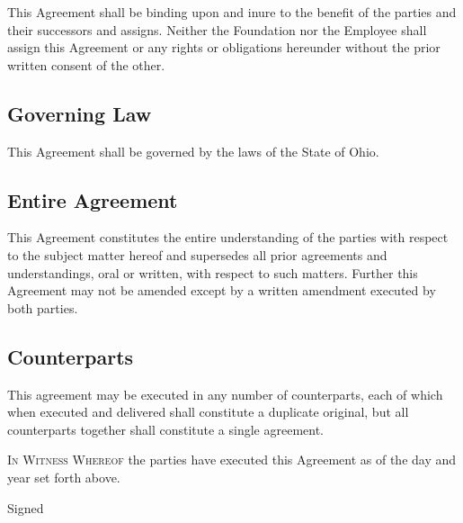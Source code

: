 \documentclass{ross}
\begin{document}
This Agreement shall be binding upon and inure to the benefit of the parties and their successors and assigns. Neither the Foundation nor the Employee shall assign this Agreement or any rights or obligations hereunder without the prior written consent of the other.

\subsection{Governing Law}

This Agreement shall be governed by the laws of the State of Ohio.

\subsection{Entire Agreement}

This Agreement constitutes the entire understanding of the parties with respect to the subject matter hereof and supersedes all prior agreements and understandings, oral or written, with respect to such matters.  Further this Agreement may not be amended except by a written amendment executed by both parties.

\subsection{Counterparts}

This agreement may be executed in any number of counterparts, each of which when executed and delivered shall constitute a duplicate original, but all counterparts together shall constitute a single agreement.

\textsc{In Witness Whereof} the parties have executed this Agreement as of the day and year set forth above.

\vspace{0.75in}
\hfill Signed 

\vspace{0.5in}
\hfill  {}

   
\end{document}

